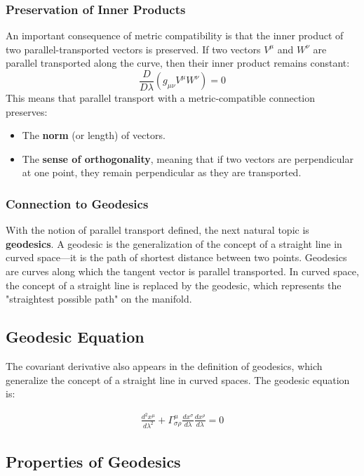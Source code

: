 \documentclass[11pt,letterpaper]{book}
\begin{document}
\subsubsection{Preservation of Inner Products}
An important consequence of metric compatibility is that the inner product of two parallel-transported vectors is preserved. If two vectors \( V^\mu \) and \( W^\nu \) are parallel transported along the curve, then their inner product remains constant:
\[
\frac{D}{D\lambda} (g_{\mu\nu} V^\mu W^\nu) = 0
\]
This means that parallel transport with a metric-compatible connection preserves:
\begin{itemize}
    \item The \textbf{norm} (or length) of vectors.
    \item The \textbf{sense of orthogonality}, meaning that if two vectors are perpendicular at one point, they remain perpendicular as they are transported.
\end{itemize}

\subsubsection{Connection to Geodesics}
With the notion of parallel transport defined, the next natural topic is \textbf{geodesics}. A geodesic is the generalization of the concept of a straight line in curved space—it is the path of shortest distance between two points. Geodesics are curves along which the tangent vector is parallel transported. In curved space, the concept of a straight line is replaced by the geodesic, which represents the "straightest possible path" on the manifold.



\subsection{Geodesic Equation}
The covariant derivative also appears in the definition of geodesics, which generalize the concept of a straight line in curved spaces. The geodesic equation is:

\begin{align}
\frac{d^2 x^\mu}{d\lambda^2} + \Gamma^\mu_{\sigma\rho} \frac{dx^\sigma}{d\lambda} \frac{dx^\rho}{d\lambda} = 0
\end{align}

\subsection{Properties of Geodesics}
\end{document}
